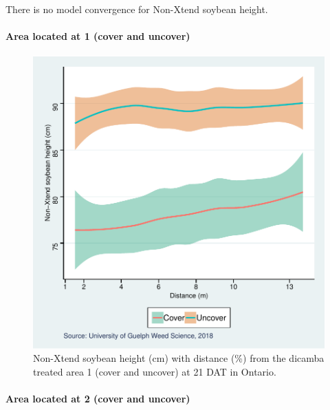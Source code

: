 \documentclass[]{article}
\let\oldparagraph\paragraph
\renewcommand{\paragraph}[1]{\oldparagraph{#1}\mbox{}}
\begin{document}
There is no model convergence for Non-Xtend soybean height.

\paragraph{Area located at 1 (cover and
uncover)}\label{area-located-at-1-cover-and-uncover-1}

\begin{figure}
\centering
\includegraphics{Report_files/figure-latex/unnamed-chunk-90-1.pdf}
\caption{Non-Xtend soybean height (cm) with distance (\%) from the
dicamba treated area 1 (cover and uncover) at 21 DAT in Ontario.}
\end{figure}

\newpage

\pagebreak

\paragraph{Area located at 2 (cover and
uncover)}\label{area-located-at-2-cover-and-uncover-1}
\end{document}
